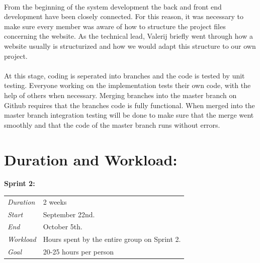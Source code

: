 \paragraph{} From the beginning of the system development the back and front end development have been closely connected. For this reason, it was necessary to make sure every member was aware of how to structure the project files concerning the website. As the technical lead, Valerij briefly went through how a website usually is structurized and how we would adapt this structure to our own project. 

\paragraph{} At this stage, coding is seperated into branches and the code is tested by unit testing. Everyone working on the implementation tests their own code, with the help of others when necessary. Merging branches into the master branch on Github requires that the branches code is fully functional. When merged into the master branch integration testing will be done to make sure that the merge went smoothly and that the code of the master branch runs without errors. 

\section{Duration and Workload:}

\begin{minipage}{\linewidth}
\centering
\setlength{\tabcolsep}{22pt}
\textbf{Sprint 2:} 
\smallskip
{}
\begin{tabular}{ |l l| }
	\hline
	\it{Duration} & 2 weeks \\
	\it{Start} & September 22nd. \\
	\it{End} & October 5th. \\
	\it{Workload} & Hours spent by the entire group on Sprint 2. \\
	\it{Goal} & 20-25 hours per person \\
	\hline
\end{tabular}
\end{minipage}

\bigskip

